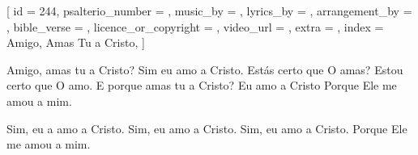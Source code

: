 
[
    id                     = {244},
    psalterio_number       = {},
    music_by               = {},
    lyrics_by              = {},
    arrangement_by         = {},
    bible_verse            = {},
    licence_or_copyright   = {},
    video_url              = {},
    extra                  = {},
    index                  = {Amigo, Amas Tu a Cristo},
]


\beginverse
Amigo, amas tu a Cristo?
Sim eu amo a Cristo.
Estás certo que O amas?
Estou certo que O amo.
E porque amas tu a Cristo?
Eu amo a Cristo
Porque Ele me amou a mim.
\endverse


\beginchorus

Sim, eu a amo a Cristo.
Sim, eu amo a Cristo.
Sim, eu amo a Cristo.
Porque Ele me amou a mim.

\endchorus



\endsong
